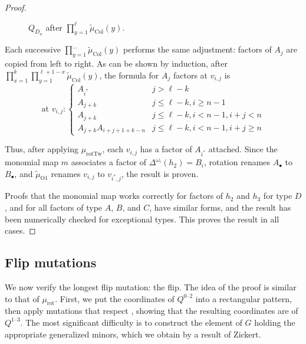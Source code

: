 \documentclass{amsart}
\theoremstyle{plain}
\theoremstyle{definition}
\theoremstyle{remark}
\newcommand{\Qdv}{Q^{0\text{--}2}}
\newcommand{\Qdh}{Q^{1\text{--}3}}
\newcommand{\fundamentalweight}{\omega}
\newcommand{\genminor}[2]{\Delta^{{#1} \fundamentalweight_{#2}}}
\newcommand{\monomialmap}{m}
\newcommand{\murot}{{\mu_{\text{rot}}}}
\newcommand{\murottwist}{{\mu_{\text{rotTw}}}}
\newcommand{\muint}[1]{\widetilde{\mu}_{\text{#1}}}
\newcommand{\mucol}{\muint{Col}}
\begin{document}
\begin{proof}
    \begin{figure}[h]
      \centering
      

      \caption{$Q_{D_n}$ after $\prod_{y=1}^{\ell}\mucol(y)$.
        \label{fig:murot-QD7-stage2}
      }
    \end{figure}

    Each successive $\prod_{y=1}^{\dotsc} \mucol(y)$ performs the same
    adjustment: factors of $A_j$ are copied from left to right. As can
    be shown by induction, after $\prod_{x=1}^{k} \prod_{y=1}^{\ell + 1
      - x} \mucol(y)$, the formula for $A_j$ factors at $v_{i,j}$ is \[
      \text{at }v_{i,j} : \begin{cases} A_{i^{\ast}} & j > \ell - k \\
        A_{j+k} & j \le \ell - k, i \ge n-1 \\ A_{j+k} & j \le \ell - k,
        i < n-1, i + j < n \\ A_{j+k} A_{i+j+1+k-n} & j \le \ell - k, i
        < n-1, i + j \ge n \end{cases} \]

    Thus, after applying $\murottwist$, each $v_{i,j}$ has a factor of
    $A_{i^{\ast}}$ attached. Since the monomial map $\monomialmap$
    associates a factor of $\genminor{}{i}(h_2) = B_{i}$, rotation
    renames $A_{\bullet}$ to $B_{\bullet}$, and $\muint{O1}$ renames
    $v_{i,j}$ to $v_{i^{\ast},j}$, the result is proven.

    Proofs that the monomial map works correctly for factors of $h_2$
    and $h_3$ for type $D$, and for all factors of type $A$, $B$, and
    $C$, have similar forms, and the result has been numerically checked
    for exceptional types. This proves the result in all cases.
  \end{proof}

  \subsection{Flip mutations}

  We now verify the longest flip mutation: the flip. The idea of the
  proof is similar to that of $\murot$. First, we put the coordinates of
  $\Qdv$ into a rectangular pattern, then apply mutations that respect
  \cite[Theorem~1.17]{fominzelevinsky1999}, showing that the resulting
  coordinates are of $\Qdh$. The most significant difficulty is to
  construct the element of $G$ holding the appropriate generalized
  minors, which we obtain by a result of Zickert.
\end{document}
